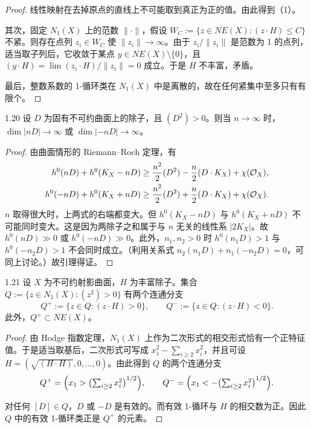 \begin{proof}
线性映射在去掉原点的直线上不可能取到真正为正的值。由此得到（1）。

其次，固定 $N_1(X)$ 上的范数 $\|\cdot\|$，假设 $W_C:=\{z\in\overline{NE}(X):(z\cdot H)\le C\}$ 不紧。则存在点列 $z_i\in W_C$ 使 $\|z_i\|\to\infty$。由于 $z_i/\|z_i\|$ 是范数为 1 的点列，适当取子列后，它收敛于某点 $y\in\overline{NE}(X)\setminus\{0\}$，且 $(y\cdot H)=\lim(z_i\cdot H)/\|z_i\|=0$ 成立。于是 $H$ 不丰富，矛盾。

最后，整数系数的 1-循环类在 $N_1(X)$ 中是离散的，故在任何紧集中至多只有有限个。
\end{proof}


\begin{lemmap}{1.20}
设 $D$ 为固有不可约曲面上的除子，且 $(D^2)>0$。则当 $n\to\infty$ 时，$\dim|nD|\to\infty$ 或 $\dim|-nD|\to\infty$。
\end{lemmap}

\begin{proof}
由曲面情形的 Riemann–Roch 定理，有
\begin{equation*}
\begin{aligned}
h^0(nD)+h^0(K_X-nD)&\ge\frac{n^2}{2}(D^2)-\frac{n}{2}(D\cdot K_X)+\chi(\mathcal{O}_X),\\
h^0(-nD)+h^0(K_X+nD)&\ge\frac{n^2}{2}(D^2)+\frac{n}{2}(D\cdot K_X)+\chi(\mathcal{O}_X).
\end{aligned}
\end{equation*}
$n$ 取得很大时，上两式的右端都变大。但 $h^0(K_X-nD)$ 与 $h^0(K_X+nD)$ 不可能同时变大。这是因为两除子之和属于与 $n$ 无关的线性系 $|2K_X|$。故 $h^0(nD)\gg0$ 或 $h^0(-nD)\gg0$。此外，$n_1,n_2>0$ 时 $h^0(n_1D)>1$ 与 $h^0(-n_2D)>1$ 不会同时成立。（利用关系式 $n_2(n_1D)+n_1(-n_2D)=0$，可同上讨论。）故引理得证。
\end{proof}

\begin{corollaryp}{1.21}
设 $X$ 为不可约射影曲面，$H$ 为丰富除子。集合 $Q:=\{z\in N_1(X):(z^2)>0\}$ 有两个连通分支
\[ Q^+:=\{z\in Q:(z\cdot H)>0\},\qquad Q^-:=\{z\in Q:(z\cdot H)<0\}. \]
此外，$Q^+\subset\overline{NE}(X)$。
\end{corollaryp}

\begin{proof}
由 Hodge 指数定理，$N_1(X)$ 上作为二次形式的相交形式恰有一个正特征值。于是适当取基后，二次形式可写成 $x_1^2-\sum_{i\ge2}x_i^2$，并且可设 $H=(\sqrt{(H\cdot H)},0,\dots,0)$。由此得到 $Q$ 的两个连通分支
\[ Q^+=\Bigl(x_1>\bigl(\textstyle\sum_{i\ge2}x_i^2\bigr)^{1/2}\Bigr),\qquad Q^-=\Bigl(x_1<-\bigl(\textstyle\sum_{i\ge2}x_i^2\bigr)^{1/2}\Bigr). \]

对任何 $[D]\in Q$，$D$ 或 $-D$ 是有效的。而有效 1-循环与 $H$ 的相交数为正。因此 $Q$ 中的有效 1-循环类正是 $Q^+$ 的元素。
\end{proof}

